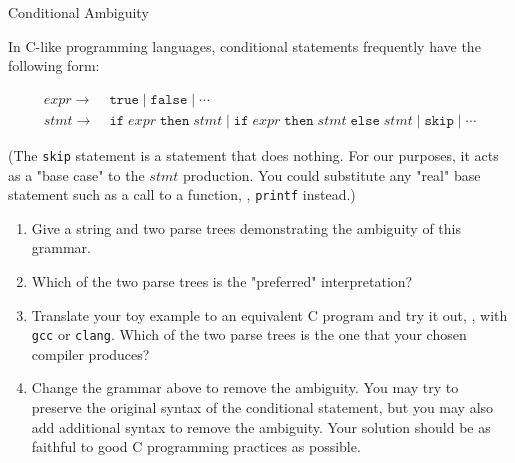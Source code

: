 \documentclass[11pt]{book}
\begin{document}
\begin{problem}{Conditional Ambiguity}

In C-like programming languages, conditional statements frequently have the following form:

\begin{align*}
  expr →&\; \texttt{true} \mid \texttt{false} \mid \cdots \\
  stmt →&\; \texttt{if}\;expr\;\texttt{then}\;stmt \mid \texttt{if}\;expr\;\texttt{then}\;stmt\;\texttt{else}\;stmt \mid \texttt{skip} \mid \cdots
\end{align*}

(The \texttt{skip} statement is a statement that does nothing.
For our purposes, it acts as a "base case" to the \( stmt \) production.
You could substitute any "real" base statement such as a call to a function, \eg, \texttt{printf} instead.)

\begin{enumerate}
  \item Give a string and two parse trees demonstrating the ambiguity of this grammar.
  \item Which of the two parse trees is the "preferred" interpretation?
  \item Translate your toy example to an equivalent C program and try it out, \eg, with \texttt{gcc} or \texttt{clang}.
    Which of the two parse trees is the one that your chosen compiler produces?
  \item Change the grammar above to remove the ambiguity.
    You may try to preserve the original syntax of the conditional statement, but you may also add additional syntax to remove the ambiguity.
    Your solution should be as faithful to good C programming practices as possible.
\end{enumerate}

\end{problem}
\end{document}
